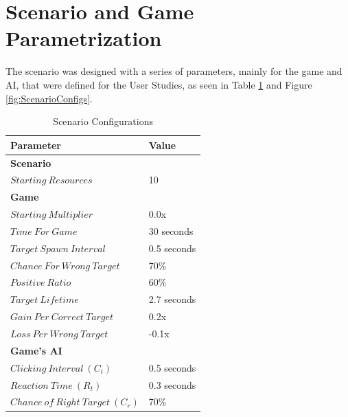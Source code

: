 \section{Scenario and Game Parametrization}
The scenario was designed with a series of parameters, mainly for the game and AI, that were defined for the User Studies, as seen in Table \ref{tbl:ScenarioConfigurations} and Figure \ref{fig:ScenarioConfigs}.

\begin{table}[h]
    \centering
    \begin{tabular}{|l|l|}
        \hline
        \textbf{Parameter}              &  \textbf{Value}   \\ \hline
        \multicolumn{2}{|l|}{\textbf{Scenario}}             \\ \hline
        $Starting\ Resources$           &  10               \\ \hline
        \multicolumn{2}{|l|}{\textbf{Game}}                 \\ \hline
        $Starting\ Multiplier$          &  0.0x             \\ \hline
        $Time\ For\ Game$               &  30 seconds       \\ \hline
        $Target\ Spawn\ Interval$       &  0.5 seconds      \\ \hline
        $Chance\ For\ Wrong\ Target$    &  70\%             \\ \hline
        $Positive\ Ratio$               &  60\%             \\ \hline
        $Target\ Lifetime$              &  2.7 seconds      \\ \hline
        $Gain\ Per\ Correct\ Target$    &  0.2x             \\ \hline
        $Loss\ Per\ Wrong\ Target$      &  -0.1x            \\ \hline
        \multicolumn{2}{|l|}{\textbf{Game's AI}}            \\ \hline
        $Clicking\ Interval\ (C_i)$     &  0.5 seconds      \\ \hline
        $Reaction\ Time\ (R_t)$         &  0.3 seconds      \\ \hline
        $Chance\ of\ Right\ Target\ (C_r)$ & 70\%           \\ \hline
    \end{tabular}
    \caption{Scenario Configurations}
    \label{tbl:ScenarioConfigurations}
\end{table}

